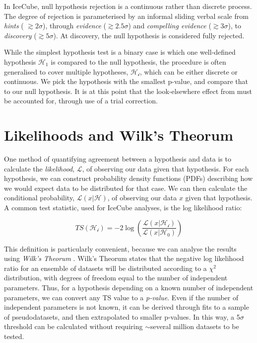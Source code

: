In IceCube, null hypothesis rejection is a continuous rather than discrete process. The degree of rejection is parameterised by an informal sliding verbal scale from \emph{hints} ( $\gtrsim 2 \sigma$), through \emph{evidence} ($\gtrsim2.5 \sigma$) and \emph{compelling evidence} ($\gtrsim3 \sigma$), to \emph{discovery} ($\gtrsim5 \sigma$). At discovery, the null hypothesis is considered fully rejected.

While the simplest hypothesis test is a binary case is which one well-defined hypothesis $\mathcal{H_{1}}$ is compared to the null hypothesis, the procedure is often generalised to cover multiple hypotheses, $\mathcal{H_{i}}$, which can be either discrete or continuous. We pick the hypothesis with the smallest p-value, and compare that to our null hypothesis. It is at this point that the look-elsewhere effect from must be accounted for, through use of a trial correction. 

\section{Likelihoods and Wilk's Theorum}

One method of quantifying agreement between a hypothesis and data is to calculate the \emph{likelihood}, $\mathcal{L}$, of observing our data given that hypothesis. For each hypothesis, we can construct probability density functions (PDFs) describing how we would expect data to be distributed for that case. We can then calculate the conditional probability, $\mathcal{L}(x | \mathcal{H})$, of observing our data $x$ given that hypothesis. A common test statistic, used for IceCube analyses, is the log likelihood ratio:

\[ TS (\mathcal{H_{i}}) = - 2 \log \left( \frac{\mathcal{L}(x | \mathcal{H_{i}})}{\mathcal{L}(x | \mathcal{H_{0}})} \right)\]

This definition is particularly convenient, because we can analyse the results using \emph{Wilk's Theorum} . Wilk's Theorum states that the negative log likelihood ratio for an ensemble of datasets will be distributed according to a $\chi^{2}$ distribution, with degrees of freedom equal to the number of independent parameters. Thus, for a hypothesis depending on a known number of independent parameters, we can convert any TS value to a \emph{p-value}. Even if the number of independent parameters is not known, it can be derived through fits to a sample of pseudodatasets, and then extrapolated to smaller p-values. In this way, a 5$\sigma$ threshold can be calculated without requiring $\sim$several million datasets to be tested.

